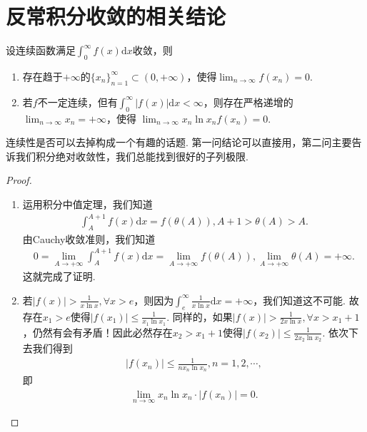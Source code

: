 \documentclass[../../main.tex]{subfiles}
\begin{document}
\section{反常积分收敛的相关结论}

\begin{proposition}[积分收敛必有子列趋于0]\label{proposition:积分收敛必有子列趋于0}
设连续函数满足$\int_{0}^{\infty}f(x)\mathrm{d}x$收敛，则
\begin{enumerate}[(1)]
\item 存在趋于$+\infty$的$\{x_n\}_{n = 1}^{\infty}\subset(0,+\infty)$，使得$\lim_{n\to\infty}f(x_n)=0$.

\item 若$f$不一定连续，但有$\int_{0}^{\infty}|f(x)|\mathrm{d}x < \infty$，则存在严格递增的$\lim_{n\to\infty}x_n = +\infty$，使得
$\lim_{n\to\infty}x_n\ln x_nf(x_n)=0$.
\end{enumerate}
\end{proposition}
\begin{note}
连续性是否可以去掉构成一个有趣的话题. 第一问结论可以直接用，第二问主要告诉我们积分绝对收敛性，我们总能找到很好的子列极限.
\end{note}
\begin{proof}
\begin{enumerate}[(1)]
\item 运用积分中值定理，我们知道
\begin{align*}
\int_{A}^{A + 1}f(x)\mathrm{d}x = f(\theta(A)), A + 1 > \theta(A) > A.
\end{align*}
由Cauchy收敛准则，我们知道
\begin{align*}
0 = \lim_{A\to +\infty}\int_{A}^{A + 1}f(x)\mathrm{d}x = \lim_{A\to +\infty}f(\theta(A)), \lim_{A\to +\infty}\theta(A) = +\infty.
\end{align*}
这就完成了证明.

\item 若$|f(x)| > \frac{1}{x\ln x}, \forall x > e$，则因为$\int_{e}^{\infty}\frac{1}{x\ln x}\mathrm{d}x = +\infty$，我们知道这不可能. 故存在$x_1 > e$使得$|f(x_1)| \leqslant \frac{1}{x_1\ln x_1}$.
同样的，如果$|f(x)| > \frac{1}{2x\ln x}, \forall x > x_1 + 1$，仍然有会有矛盾！因此必然存在$x_2 > x_1 + 1$使得$|f(x_2)| \leqslant \frac{1}{2x_2\ln x_2}$. 依次下去我们得到
\begin{align*}
|f(x_n)| \leqslant \frac{1}{nx_n\ln x_n}, n = 1,2,\cdots,
\end{align*}
即
\begin{align*}
\lim_{n\to\infty}x_n\ln x_n\cdot|f(x_n)| = 0.
\end{align*} 
\end{enumerate}
\end{proof}
\end{document}
